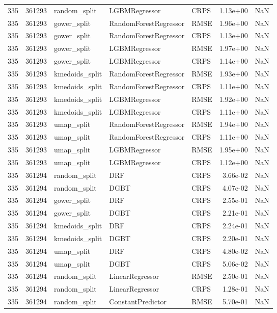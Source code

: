\begin{tabular}{rrlllrr}
335 & 361293 & random\_split & LGBMRegressor & CRPS & 1.13e+00 & NaN \\
335 & 361293 & gower\_split & RandomForestRegressor & RMSE & 1.96e+00 & NaN \\
335 & 361293 & gower\_split & RandomForestRegressor & CRPS & 1.13e+00 & NaN \\
335 & 361293 & gower\_split & LGBMRegressor & RMSE & 1.97e+00 & NaN \\
335 & 361293 & gower\_split & LGBMRegressor & CRPS & 1.14e+00 & NaN \\
335 & 361293 & kmedoids\_split & RandomForestRegressor & RMSE & 1.93e+00 & NaN \\
335 & 361293 & kmedoids\_split & RandomForestRegressor & CRPS & 1.11e+00 & NaN \\
335 & 361293 & kmedoids\_split & LGBMRegressor & RMSE & 1.92e+00 & NaN \\
335 & 361293 & kmedoids\_split & LGBMRegressor & CRPS & 1.11e+00 & NaN \\
335 & 361293 & umap\_split & RandomForestRegressor & RMSE & 1.94e+00 & NaN \\
335 & 361293 & umap\_split & RandomForestRegressor & CRPS & 1.11e+00 & NaN \\
335 & 361293 & umap\_split & LGBMRegressor & RMSE & 1.95e+00 & NaN \\
335 & 361293 & umap\_split & LGBMRegressor & CRPS & 1.12e+00 & NaN \\
335 & 361294 & random\_split & DRF & CRPS & 3.66e-02 & NaN \\
335 & 361294 & random\_split & DGBT & CRPS & 4.07e-02 & NaN \\
335 & 361294 & gower\_split & DRF & CRPS & 2.55e-01 & NaN \\
335 & 361294 & gower\_split & DGBT & CRPS & 2.21e-01 & NaN \\
335 & 361294 & kmedoids\_split & DRF & CRPS & 2.24e-01 & NaN \\
335 & 361294 & kmedoids\_split & DGBT & CRPS & 2.20e-01 & NaN \\
335 & 361294 & umap\_split & DRF & CRPS & 4.80e-02 & NaN \\
335 & 361294 & umap\_split & DGBT & CRPS & 5.06e-02 & NaN \\
335 & 361294 & random\_split & LinearRegressor & RMSE & 2.50e-01 & NaN \\
335 & 361294 & random\_split & LinearRegressor & CRPS & 1.28e-01 & NaN \\
335 & 361294 & random\_split & ConstantPredictor & RMSE & 5.70e-01 & NaN \\

\end{tabular}
